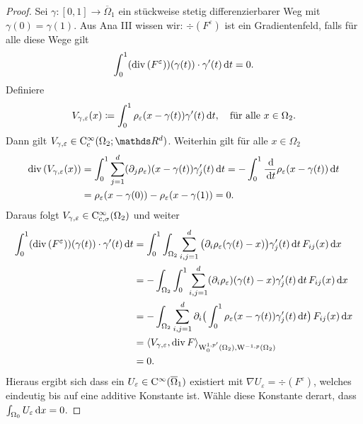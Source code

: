 \begin{proof}
  Sei $\gamma \colon [0,1] \to \overline\Omega_1$ ein stückweise stetig differenzierbarer Weg mit $\gamma(0) = \gamma(1)$.
  Aus Ana III wissen wir: $\div(F^\varepsilon)$ ist ein Gradientenfeld, falls für alle diese Wege gilt
  $$
  \int_0^1 (\mathrm{div\,} (F^\varepsilon))(\gamma(t))\cdot \gamma'(t) \, {\operatorname{d}\!{t}} = 0.
  $$
  Definiere 
  $$
  V_{\gamma,\varepsilon}(x) \coloneqq \int_0^1 \rho_\varepsilon(x - \gamma(t))\gamma'(t) \, {\operatorname{d}\!{t}}, \quad\text{für alle } x \in \Omega_2.
  $$
  Dann gilt $V_{\gamma,\varepsilon} \in \CC_{\cc}^\infty(\Omega_2; \R^d)$.
  Weiterhin gilt für alle $x \in \Omega_2$
  \begin{align*}
    \mathrm{div\,} (V_{\gamma,\varepsilon}(x))
    &= \int_0^1 \sum_{j = 1}^d (\partial_j \rho_\varepsilon)(x - \gamma(t)) \gamma_j'(t) \, {\operatorname{d}\!{t}}
    = - \int_0^1 \frac{\, {\operatorname{d}\!{}} }{\, {\operatorname{d}\!{t}}} \rho_\varepsilon(x - \gamma(t)) \, {\operatorname{d}\!{t}} \\
    &= \rho_\varepsilon(x - \gamma(0)) - \rho_\varepsilon(x - \gamma(1))
    = 0.
  \end{align*}
  Daraus folgt $V_{\gamma,\varepsilon} \in \mathrm{C}_{\mathrm{c}, \sigma}^\infty(\Omega_2)$ und weiter
  \begin{align*}
    \int_0^1(\mathrm{div\,} (F^\varepsilon))(\gamma(t)) \cdot \gamma'(t) \, {\operatorname{d}\!{t}}
    &= \int_0^1 \int_{\Omega_2} \sum_{i,j = 1}^d \big(\partial_i \rho_\varepsilon(\gamma(t) - x)\big) \gamma_j'(t) \, {\operatorname{d}\!{t}} \, F_{ij}(x)  \, {\operatorname{d}\!{x}} \\
    &= -\int_{\Omega_2} \int_0^1 \sum_{i,j = 1}^d (\partial_i \rho_\varepsilon) (\gamma(t) - x) \gamma_j'(t) \, {\operatorname{d}\!{t}} \, F_{ij}(x) \, {\operatorname{d}\!{x}} \\
    &= -\int_{\Omega_2} \sum_{i,j=1}^d \partial_i\big(  \int_0^1 \rho_\varepsilon(x - \gamma(t)) \gamma_j'(t) \, {\operatorname{d}\!{t}} \big) \, F_{ij}(x) \, {\operatorname{d}\!{x}} \\
    &= \langle V_{\gamma,\varepsilon}, \mathrm{div\,} F \rangle_{\mathrm{W}_0^{1,p'}(\Omega_2), \mathrm{W}^{-1,p}(\Omega_2)} \\
    &= 0.
  \end{align*}
  Hieraus ergibt sich dass ein $U_\varepsilon \in \mathrm{C}^\infty(\overline\Omega_1)$ existiert mit $\nabla U_\varepsilon = \div(F^\varepsilon)$, welches eindeutig bis auf eine additive Konstante ist.
  Wähle diese Konstante derart, dass $\int_{\Omega_0} U_\varepsilon \, {\operatorname{d}\!{x}} = 0$.


\end{proof}
